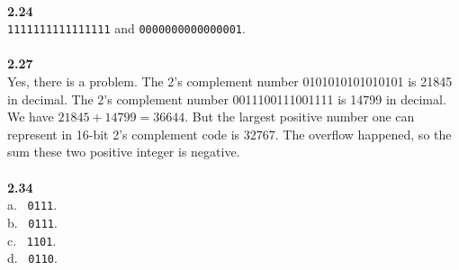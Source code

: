 \documentclass[a4paper,12pt]{article}     %
\begin{document}
~\\
\textbf{2.24}\\
\verb|1111111111111111| and \verb|0000000000000001|.\\

~\\
\textbf{2.27}\\
Yes, there is a problem. The 2's complement number 0101010101010101 is 21845 in decimal. The 2's complement number 0011100111001111 is 14799 in decimal. We have $21845 + 14799 = 36644$. But the largest positive number one can represent in 16-bit 2's complement code is 32767. The overflow happened, so the sum these two positive integer is negative.\\

~\\
\textbf{2.34}\\
a. \ \verb|0111|.\\
b. \ \verb|0111|.\\
c. \ \verb|1101|.\\
d. \ \verb|0110|.\\
\end{document}
